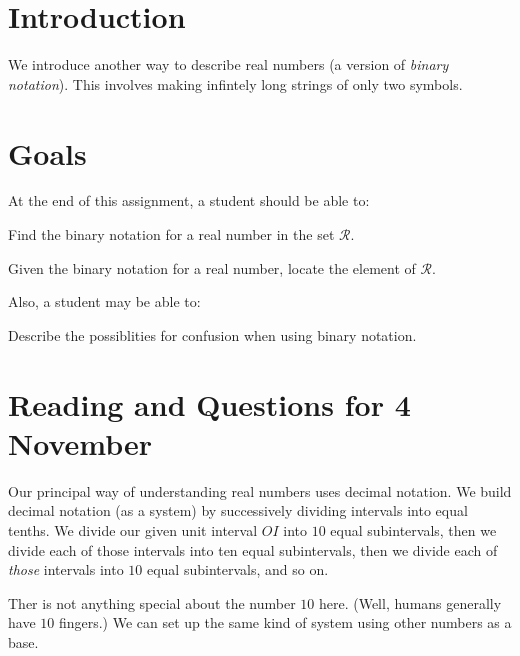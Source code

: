 \documentclass[12pt,letterpaper]{article}
\theoremstyle{definition}
\begin{document}
\setlength{\parskip}{1ex plus 0.5ex minus 0.2ex}
\setlength{\parindent}{0pt}

\pagestyle{fancy}
\cfoot{}

\section*{Introduction}
We introduce another way to describe real numbers (a version of \emph{binary notation}).
This involves making infintely long strings of only two symbols.

\section*{Goals}
At the end of this assignment, a student should be able to:
\begin{compactitem}
\item Find the binary notation for a real number in the set $\mathcal{R}$.
\item Given the binary notation for a real number, locate the element of $\mathcal{R}$.
\end{compactitem}
Also, a student may be able to:
\begin{compactitem}
\item Describe the possiblities for confusion when using binary notation.
\end{compactitem}

\section*{Reading and Questions for 4 November}

Our principal way of understanding real numbers uses decimal notation.
We build decimal notation (as a system) by successively dividing intervals into equal tenths.
We divide our given unit interval $OI$ into $10$ equal subintervals, then we divide each of those intervals into ten equal subintervals, then we divide each of \emph{those} intervals into $10$ equal subintervals, and so on.


Ther is not anything special about the number $10$ here.
(Well, humans generally have $10$ fingers.)
We can set up the same kind of system using other numbers as a base.
\end{document}
